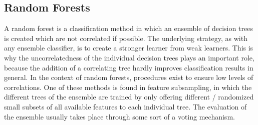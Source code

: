 \subsection{Random Forests}\label{subsec:random_forests}

A random forest is a classification method in which an ensemble of decision trees is created which are not correlated if possible. The underlying strategy, as with any ensemble classifier, is to create a stronger learner from weak learners. This is why the uncorrelatedness of the individual decision trees plays an important role, because the addition of a correlating tree hardly improves classification results in general. In the context of random forests, procedures exist to ensure low levels of correlations. One of these methods is found in feature subsampling, in which the different trees of the ensemble are trained by only offering different / randomized small subsets of all available features to each individual tree.  The evaluation of the ensemble usually takes place through some sort of a voting mechanism. \cite{Jiang}

